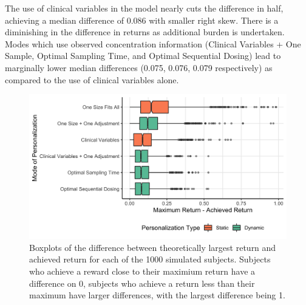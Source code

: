 The use of clinical variables in the model nearly cuts the difference in half, achieving a median difference of 0.086 with smaller right skew.  There is a diminishing in the difference in returns as additional burden is undertaken. Modes which use observed concentration information (Clinical Variables + One Sample, Optimal Sampling Time, and Optimal Sequential Dosing) lead to marginally lower median differences  (0.075, 0.076, 0.079 respectively) as compared to the use of clinical variables alone.


\begin{figure}
	\centering
	\includegraphics[width=1\linewidth]{figures/models_of_personalization_differences}
	\caption{Boxplots of the difference between theoretically largest return and achieved return for each of the 1000 simulated subjects. Subjects who achieve a reward close to their maximium return have a difference on 0, subjects who achieve a return less than their maximum have larger differences, with the largest difference being 1.}
	\label{fig:modelsofpersonalizationdifferences}
\end{figure}
